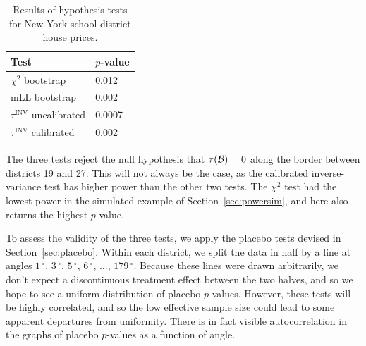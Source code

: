 \documentclass[letter,12pt]{article}
\DeclarePairedDelimiter{\parenthesis}{\lparen}{\rparen}
\newcommand{\del}[1]{\parenthesis*{#1}}
\newcommand{\border}{\mathcal{B}}
\newcommand{\invvar}{\tau^{\mathrm{INV}}}
\newcommand{\degree}{{\,^\circ}}
\begin{document}
\begin{table}[tbp]
    \centering
    \label{table:NYC_tests}
    \begin{tabular}{ll}
        \hline
        Test                   & $p$-value \\
        \hline
        $\chi^2$ bootstrap     & 0.012     \\
        mLL bootstrap          & 0.002     \\
        $\invvar$ uncalibrated & 0.0007    \\
        $\invvar$ calibrated   & 0.002 \\
        \hline
    \end{tabular}
    \caption{Results of hypothesis tests for New York school district house prices.}
\end{table}
The three tests reject the null hypothesis that \(\tau\del{\border}=0\) along the border between districts 19 and 27.
This will not always be the case, as the calibrated inverse-variance test has higher power than the other two tests.
The \(\chi^2\) test had the lowest power in the simulated example of Section~\ref{sec:powersim}, and here also returns the highest \(p\)-value.



To assess the validity of the three tests, we apply the placebo tests devised in Section~\ref{sec:placebo}.
Within each district, we split the data in half by a line at angles \(1\degree\), \(3\degree\), \(5\degree\), \(6\degree\), \(\dotsc\), \(179\degree\).
Because these lines were drawn arbitrarily, we don't expect a discontinuous treatment effect between the two halves, and so we hope to see a uniform distribution of placebo \(p\)-values.
However, these tests will be highly correlated,
and so the low effective sample size could lead to some apparent departures from uniformity.
There is in fact visible autocorrelation in the graphs of placebo \(p\)-values as a function of angle.
\end{document}
